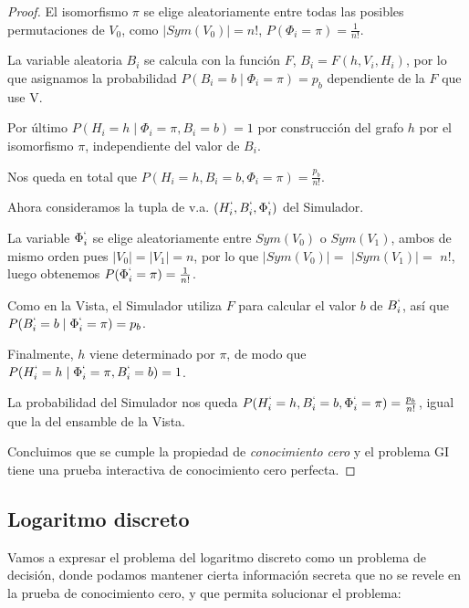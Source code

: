 \begin{proof}
	El isomorfismo $\pi$ se elige aleatoriamente entre todas las posibles permutaciones de $V_0$, como $\mid Sym(V_0) \mid = n!$, $P(\Phi_i = \pi) = \frac{1}{n!}$.
	
	La variable aleatoria $B_i$ se calcula con la función $F$, $B_i=F(h, V_i, H_i)$, por lo que asignamos la probabilidad $P(B_i = b \mid \Phi_i = \pi) = p_b$ dependiente de la $F$ que use V.

	Por último $P(H_i = h \mid \Phi_i = \pi, B_i=b) = 1$ por construcción del grafo $h$ por el isomorfismo $\pi$, independiente del valor de $B_i$.
	
	Nos queda en total que $P(H_i=h, B_i=b, \Phi_i = \pi) = \frac{p_b}{n!}$.
	
	\hfil
	
	Ahora consideramos la tupla de v.a.  $(H_i^`, B_i^`, \Phi_i^`)$ del Simulador.
	
	La variable $\Phi_i^`$ se elige aleatoriamente entre $Sym(V_0)$ o $Sym(V_1)$, ambos de mismo orden pues $\mid V_0 \mid = \mid V_1 \mid = n$, por lo que  $\mid Sym(V_0) \mid =$ $ \mid Sym(V_1) \mid =$ $ n!$, luego obtenemos $P(\Phi_i^` = \pi)=\frac{1}{n!}$.
	
	Como en la Vista, el Simulador utiliza $F$ para calcular el valor $b$ de $B_i^`$, así que $P(B_i^` = b \mid \Phi_i^` = \pi) = p_b$.
	
	Finalmente, $h$ viene determinado por $\pi$, de modo que $P(H_i^` = h \mid \Phi_i^` = \pi, B_i^`=b) = 1$.
	
	La probabilidad del Simulador nos queda $P(H_i^`=h, B_i^`=b, \Phi_i^` = \pi) = \frac{p_b}{n!}$, igual que la del ensamble de la Vista.
	
	\hfil
	
	
	Concluimos que se cumple la propiedad de \textit{conocimiento cero} y el problema GI tiene una prueba interactiva de conocimiento cero perfecta.
	
	
\end{proof}







\subsection{Logaritmo discreto}\label{perfectDL}


Vamos a expresar el problema del logaritmo discreto como un problema de decisión, donde podamos mantener cierta información secreta que no se revele en la prueba de conocimiento cero, y que permita solucionar el problema:

